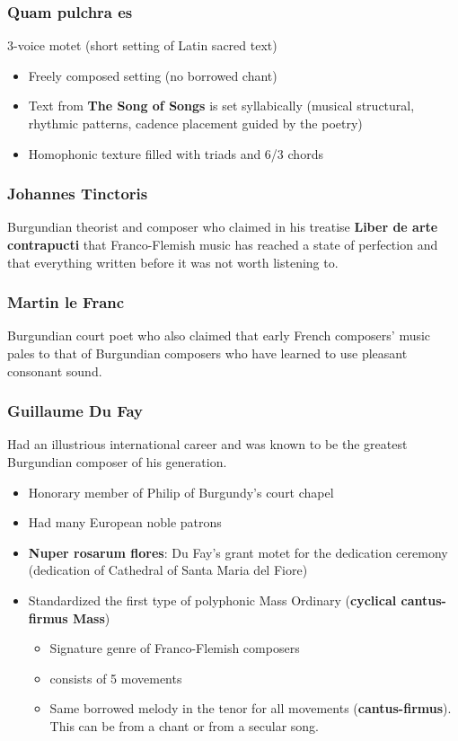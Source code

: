 \documentclass{article}
\begin{document}
  \subsubsection{Quam pulchra es}
  3-voice motet (short setting of Latin sacred text)
  \begin{itemize}
    \item Freely composed setting (no borrowed chant) 
    \item Text from \textbf{The Song of Songs} is set syllabically (musical structural, rhythmic patterns, cadence placement guided by the poetry)
    \item Homophonic texture filled with triads and 6/3 chords
  \end{itemize}
  \subsubsection{Johannes Tinctoris}
  Burgundian theorist and composer who claimed in his treatise \textbf{Liber de arte contrapucti} that Franco-Flemish music has reached a state of perfection and that everything written before it was not worth listening to.
  \subsubsection{Martin le Franc}
  Burgundian court poet who also claimed that early French composers' music pales to that of Burgundian composers who have learned to use pleasant consonant sound.
  \subsubsection{Guillaume Du Fay}
  Had an illustrious international career and was known to be the greatest Burgundian composer of his generation.
  \begin{itemize}
    \item Honorary member of Philip of Burgundy's court chapel
    \item Had many European noble patrons
    \item \textbf{Nuper rosarum flores}: Du Fay's grant motet for the dedication ceremony (dedication of Cathedral of Santa Maria del Fiore)
    \item Standardized the first type of polyphonic Mass Ordinary (\textbf{cyclical cantus-firmus Mass})
      \begin{itemize}
        \item Signature genre of Franco-Flemish composers
        \item consists of 5 movements
        \item Same borrowed melody in the tenor for all movements (\textbf{cantus-firmus}). This can be from a chant or from a secular song.
      \end{itemize}
  \end{itemize}
\end{document}
